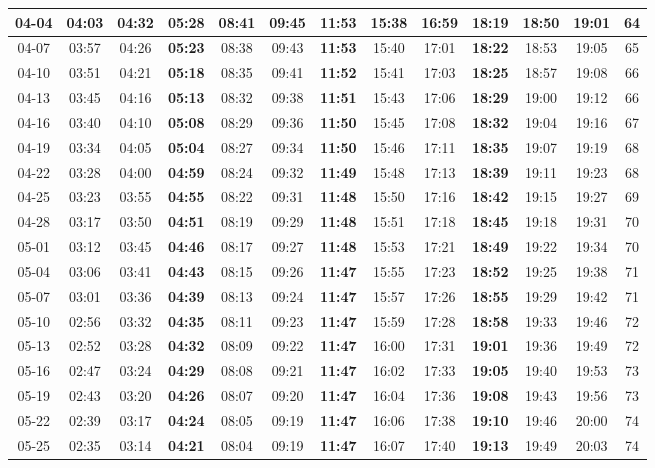 \begin{footnotesize}
\begin{longtable}{c | c | c | c | c | c | c | c | c | c | c | c | c}
		04-04&04:03&04:32&\textbf{05:28}&08:41&09:45&\textbf{11:53}&15:38&16:59&\textbf{18:19}&18:50&19:01&64\\\hline
		04-07&03:57&04:26&\textbf{05:23}&08:38&09:43&\textbf{11:53}&15:40&17:01&\textbf{18:22}&18:53&19:05&65\\\hline
		04-10&03:51&04:21&\textbf{05:18}&08:35&09:41&\textbf{11:52}&15:41&17:03&\textbf{18:25}&18:57&19:08&66\\\hline
		04-13&03:45&04:16&\textbf{05:13}&08:32&09:38&\textbf{11:51}&15:43&17:06&\textbf{18:29}&19:00&19:12&66\\\hline
		04-16&03:40&04:10&\textbf{05:08}&08:29&09:36&\textbf{11:50}&15:45&17:08&\textbf{18:32}&19:04&19:16&67\\\hline
		04-19&03:34&04:05&\textbf{05:04}&08:27&09:34&\textbf{11:50}&15:46&17:11&\textbf{18:35}&19:07&19:19&68\\\hline
		04-22&03:28&04:00&\textbf{04:59}&08:24&09:32&\textbf{11:49}&15:48&17:13&\textbf{18:39}&19:11&19:23&68\\\hline
		04-25&03:23&03:55&\textbf{04:55}&08:22&09:31&\textbf{11:48}&15:50&17:16&\textbf{18:42}&19:15&19:27&69\\\hline
		04-28&03:17&03:50&\textbf{04:51}&08:19&09:29&\textbf{11:48}&15:51&17:18&\textbf{18:45}&19:18&19:31&70\\\hline
		05-01&03:12&03:45&\textbf{04:46}&08:17&09:27&\textbf{11:48}&15:53&17:21&\textbf{18:49}&19:22&19:34&70\\\hline
		05-04&03:06&03:41&\textbf{04:43}&08:15&09:26&\textbf{11:47}&15:55&17:23&\textbf{18:52}&19:25&19:38&71\\\hline
		05-07&03:01&03:36&\textbf{04:39}&08:13&09:24&\textbf{11:47}&15:57&17:26&\textbf{18:55}&19:29&19:42&71\\\hline
		05-10&02:56&03:32&\textbf{04:35}&08:11&09:23&\textbf{11:47}&15:59&17:28&\textbf{18:58}&19:33&19:46&72\\\hline
		05-13&02:52&03:28&\textbf{04:32}&08:09&09:22&\textbf{11:47}&16:00&17:31&\textbf{19:01}&19:36&19:49&72\\\hline
		05-16&02:47&03:24&\textbf{04:29}&08:08&09:21&\textbf{11:47}&16:02&17:33&\textbf{19:05}&19:40&19:53&73\\\hline
		05-19&02:43&03:20&\textbf{04:26}&08:07&09:20&\textbf{11:47}&16:04&17:36&\textbf{19:08}&19:43&19:56&73\\\hline
		05-22&02:39&03:17&\textbf{04:24}&08:05&09:19&\textbf{11:47}&16:06&17:38&\textbf{19:10}&19:46&20:00&74\\\hline
		05-25&02:35&03:14&\textbf{04:21}&08:04&09:19&\textbf{11:47}&16:07&17:40&\textbf{19:13}&19:49&20:03&74\\\hline

\end{longtable}
\end{footnotesize}
